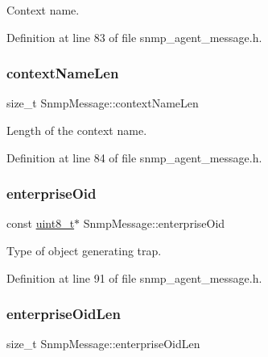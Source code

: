 Context name. 



Definition at line 83 of file snmp\+\_\+agent\+\_\+message.\+h.

\mbox{\label{structSnmpMessage_a64d47bc4ef9cdfaae0494c8b224b26cb}} 
\subsubsection{\texorpdfstring{context\+Name\+Len}{contextNameLen}}
{\footnotesize\ttfamily size\+\_\+t Snmp\+Message\+::context\+Name\+Len}



Length of the context name. 



Definition at line 84 of file snmp\+\_\+agent\+\_\+message.\+h.

\mbox{\label{structSnmpMessage_a807a5b8b2aaf91ba7ad7c5130f7de5fe}} 
\subsubsection{\texorpdfstring{enterprise\+Oid}{enterpriseOid}}
{\footnotesize\ttfamily const \hyperlink{stdint_8h_aba7bc1797add20fe3efdf37ced1182c5}{uint8\+\_\+t}$\ast$ Snmp\+Message\+::enterprise\+Oid}



Type of object generating trap. 



Definition at line 91 of file snmp\+\_\+agent\+\_\+message.\+h.

\mbox{\label{structSnmpMessage_a70d5dc7f03456b144b0d29a6a30b0a21}} 
\subsubsection{\texorpdfstring{enterprise\+Oid\+Len}{enterpriseOidLen}}
{\footnotesize\ttfamily size\+\_\+t Snmp\+Message\+::enterprise\+Oid\+Len}



